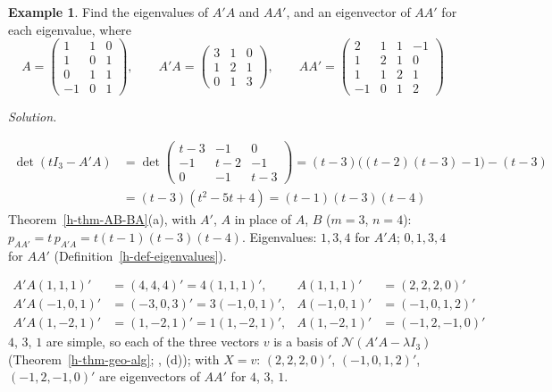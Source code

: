 \documentclass[12pt]{article}
\theoremstyle{definition}
\newtheorem{example}[theorem]{Example}
\newcommand{\boardtop}{\vspace*{-\abovedisplayskip}}
\begin{document}
\begin{example}\label{h-exm-ata}
Find the eigenvalues of \(A'A\) and \(AA'\), and an eigenvector of \(AA'\) for each eigenvalue, where
\[
A=\begin{pmatrix}1&1&0\\1&0&1\\0&1&1\\-1&0&1\end{pmatrix},\qquad
A'A=\begin{pmatrix}3&1&0\\1&2&1\\0&1&3\end{pmatrix},\qquad
AA'=\begin{pmatrix}2&1&1&-1\\1&2&1&0\\1&1&2&1\\-1&0&1&2\end{pmatrix}
\]
\end{example}
\textit{Solution.}
\begin{board}
\[
\begin{aligned}
\det(tI_3-A'A)&=\det\begin{pmatrix}t-3&-1&0\\-1&t-2&-1\\0&-1&t-3\end{pmatrix}
=(t-3)\bigl((t-2)(t-3)-1\bigr)-(t-3)\\
&=(t-3)(t^2-5t+4)=(t-1)(t-3)(t-4)
\end{aligned}
\]
Theorem~\ref{h-thm-AB-BA}(a), with \(A'\), \(A\) in place of \(A\), \(B\) (\(m=3\), \(n=4\)):
\(p_{AA'}=t\,p_{A'A}=t(t-1)(t-3)(t-4)\). Eigenvalues: \(1,3,4\) for \(A'A\); \(0,1,3,4\) for \(AA'\)
(Definition~\ref{h-def-eigenvalues}).
\end{board}
\begin{board}[\(\lambda=4,3,1\): eigenvectors of \(A'A\), mapped by \(A\) (Theorem~\ref{h-thm-AB-BA}(b) with \(A'\),
\(A\) in place of \(A\), \(B\)):]
\boardtop
\begin{align*}
A'A(1,1,1)'&=(4,4,4)'=4(1,1,1)',&A(1,1,1)'&=(2,2,2,0)'\\
A'A(-1,0,1)'&=(-3,0,3)'=3(-1,0,1)',&A(-1,0,1)'&=(-1,0,1,2)'\\
A'A(1,-2,1)'&=(1,-2,1)'=1(1,-2,1)',&A(1,-2,1)'&=(-1,2,-1,0)'
\end{align*}
\(4\), \(3\), \(1\) are simple, so each of the three vectors \(v\) is a basis of \(\mathcal N(A'A-\lambda I_3)\)
(Theorem~\ref{h-thm-geo-alg}; , (d)); with \(X=v\): \((2,2,2,0)'\), \((-1,0,1,2)'\), \((-1,2,-1,0)'\) are
eigenvectors of \(AA'\) for \(4\), \(3\), \(1\).
\end{board}
\end{document}

